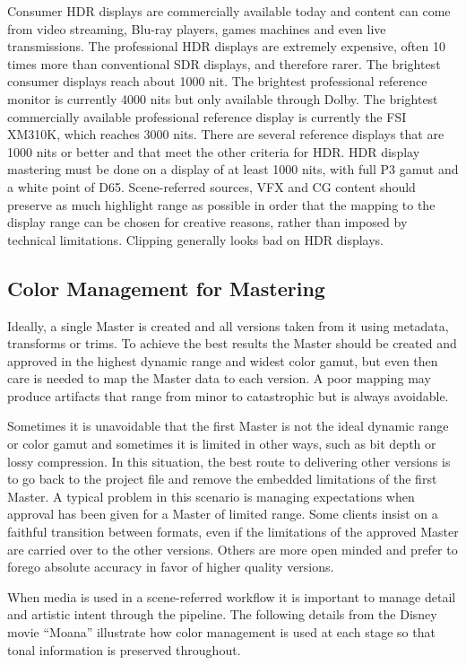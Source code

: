 Consumer HDR displays are commercially available today and content can come from video streaming, Blu-ray players, games machines and even live transmissions. The professional HDR displays are extremely expensive, often 10 times more than conventional SDR displays, and therefore rarer. The brightest consumer displays reach about 1000 nit. The brightest professional reference monitor is currently 4000 nits but only available through Dolby. The brightest commercially available professional reference display is currently the FSI XM310K, which reaches 3000 nits. There are several reference displays that are 1000 nits or better and that meet the other criteria for HDR. HDR display mastering must be done on a display of at least 1000 nits, with full P3 gamut and a white point of D65. Scene-referred sources, VFX and CG content should preserve as much highlight range as possible in order that the mapping to the display range can be chosen for creative reasons, rather than imposed by technical limitations. Clipping generally looks bad on HDR displays. 

\subsection{Color Management for Mastering}

Ideally, a single Master is created and all versions taken from it using metadata, transforms or trims. To achieve the best results the Master should be created and approved in the highest dynamic range and widest color gamut, but even then care is needed to map the Master data to each version. A poor mapping may produce artifacts that range from minor to catastrophic but is always avoidable.

Sometimes it is unavoidable that the first Master is not the ideal dynamic range or color gamut and sometimes it is limited in other ways, such as bit depth or lossy compression. In this situation, the best route to delivering other versions is to go back to the project file and remove the embedded limitations of the first Master. A typical problem in this scenario is managing expectations when approval has been given for a Master of limited range. Some clients insist on a faithful transition between formats, even if the limitations of the approved Master are carried over to the other versions. Others are more open minded and prefer to forego absolute accuracy in favor of higher quality versions.

When media is used in a scene-referred workflow it is important to manage detail and artistic intent through the pipeline. The following details from the Disney movie “Moana” illustrate how color management is used at each stage so that tonal information is preserved throughout. 

